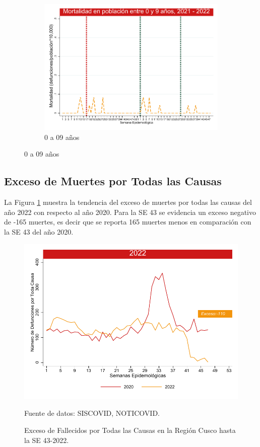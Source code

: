\documentclass[12pt,a4paper,openany]{book}
\begin{document}
\begin{figure}[h]
		\vspace{10mm}
		\begin{subfigure}[b]{0.45\textwidth}
			\centering
			\includegraphics[width=\textwidth]{../figuras/mortalidad_edad_0.pdf}
			\caption{0 a 09 años}
		\end{subfigure}
	\end{figure}
	\clearpage	
	\subsection*{Exceso de Muertes por Todas las Causas}
	\noindent La Figura \ref{fig:exceso_regional} muestra la tendencia del exceso de muertes por todas las causas del año 2022 con respecto al año 2020.  Para la SE 43 se evidencia un exceso negativo de -165 muertes, es decir que se reporta 165 muertes menos en comparación con la SE 43 del año 2020.
	
	
	
	\begin{figure}[h]
		\caption{Exceso de Fallecidos por Todas las Causas en la Región Cusco hasta la SE 43-2022.}\label{fig:exceso_regional}
		\begin{center}
			\includegraphics[width=0.85\linewidth]{../figuras/exceso_region_2022.pdf}
		\end{center}
		{\footnotesize {Fuente de datos: SISCOVID, NOTICOVID.}}
	\end{figure}
	\clearpage
	
\end{document}

